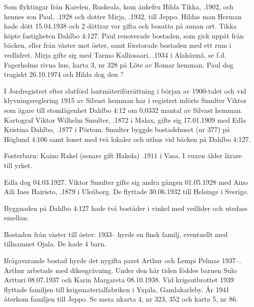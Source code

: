 Som flyktingar från Karelen, Ruskeala, kom änkefru Hilda Tikka, .1902, och hennes son Paul, .1928 och dotter Mirja,	.1932, till Jeppo. Hildas man Herman hade dött 15.04.1938 och 2 döttrar var gifta och bosatta på annan ort. Tikka köpte fastigheten Dahlbo 4:127. Paul renoverade bostaden, som gick uppåt från bäcken,	eller från väster mot öster, samt förstorade bostaden med ett rum i vedlidret. Mirja gifte sig med Tarmo Kalliosaari, .1934 i Alahärmä, se f.d. Fagerholms rivna hus, karta 3, nr 328 på Löte av Romar hemman. Paul dog tragiskt 26.10.1974 och Hilda dog den ?


I Jordregistret efter slutförd lantmäteriförrättning i början av 1900-talet	och vid klyvningsreglering 1915 av Silvast hemman har i registret införts	Smulter Viktor som ägare till stomlägenhet Dahlbo 4:12 om 0,0332 mantal av Silvast hemman. Kartograf Viktor Wilhelm Smulter, .1872 i Malax, gifte sig 17.01.1909 med Edla Kristina Dahlbo, .1877 i 	Pörtom. Smulter byggde bostadshuset (nr 377) på Höglund 4:106 samt huset med två lokaler och uthus vid bäcken på Dahlbo 4:127.

Fosterbarn: Kaino Rakel (senare gift Hakola) .1911 i Vasa. I vuxen ålder lärare till yrket.

Edla dog 04.03.1927. Viktor Smulter gifte sig andra gången 01.05.1928 med Aino Aili Ines Hairisto, .1879 i Uleåborg. De flyttade 30.06.1932 till Helsinge i Sverige.


Byggnaden på Dahlbo 4:127 hade två bostäder i vinkel med vedlider och	utedass emellan.

Bostaden från väster till öster:
1933-- hyrde en finsk familj, eventuellt med tillnamnet Ojala. De hade 4 barn.

Ifrågavarande bostad hyrde det nygifta paret Arthur och Lempi	Pelmas 1937--. Arthur arbetade med dikesgrävning. Under den	här tiden föddes barnen Sulo Artturi 08.07.1937 och Karin	Margareta	08.10.1938. Vid krigsutbrottet 1939 flyttade familjen till	krigsmaterialfabriken i Yxpila, Gamlakarleby. År 1941 återkom familjen till Jeppo. Se mera nkarta 4, nr 323, 352 och karta 5, nr 86.


